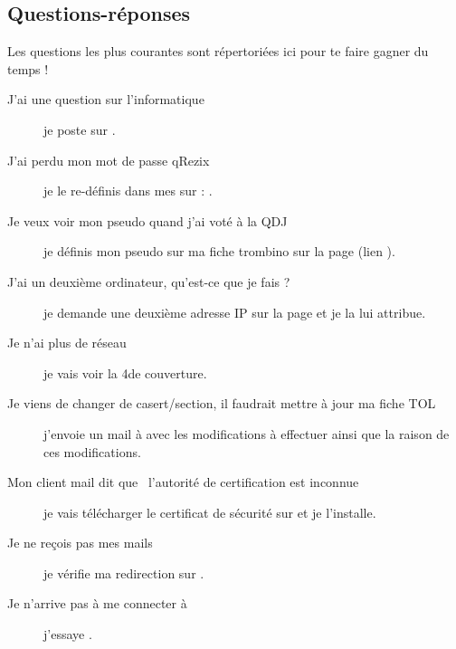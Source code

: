 
\subsection{Questions-réponses}

Les questions les plus courantes sont répertoriées ici pour te faire gagner du temps !

\begin{description}

\item[J'ai une question sur l'informatique] je poste sur .

\item[J'ai perdu mon mot de passe qRezix] je le re-définis dans mes   sur \fkz : .

\item[Je veux voir mon pseudo quand j'ai voté à la QDJ] je définis mon pseudo sur ma fiche \linebreak trombino sur la page  (lien ).

\item[J'ai un deuxième ordinateur, qu'est-ce que je fais ?] je demande une deuxième adresse IP sur la page  et je la lui attribue.

\item[Je n'ai plus de réseau] je vais voir la 4\ieme de couverture.

\item[Je viens de changer de casert/section, il faudrait mettre à jour ma fiche TOL] j'envoie \linebreak un mail à  avec les modifications à effectuer ainsi que la raison de ces
modifications.

\item[Mon client mail dit que \guillemotleft~l'autorité de certification est inconnue~\guillemotright ] je vais télécharger le certificat de sécurité sur  et je l'installe.

\item[Je ne reçois pas mes mails] je vérifie ma redirection sur .

\item[Je n'arrive pas à me connecter à ] j'essaye .


\end{description}
